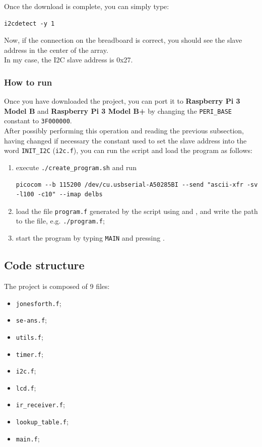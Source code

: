 \documentclass[a4paper, 12pt]{article}
\begin{document}
Once the download is complete, you can simply type:
\begin{Verbatim}[breaklines=true, breakanywhere=true]
    i2cdetect -y 1 
\end{Verbatim}
Now, if the connection on the breadboard is correct, you should see the slave address in the center of the array. \\
In my case, the I2C slave address is 0x27.

\subsubsection{How to run}

Once you have downloaded the project, you can port it to \textbf{Raspberry Pi 3 Model B} and \textbf{Raspberry Pi 3 Model B+} by changing the \texttt{PERI\_BASE} constant to \texttt{3F000000}. \\
After possibly performing this operation and reading the previous subsection, having changed if necessary the constant used to set the slave address into the word \texttt{INIT\_I2C} (\texttt{i2c.f}), you can run the script and load the program as follows:
\begin{enumerate}
    \item execute \texttt{./create\_program.sh} and run 
        \begin{Verbatim}[breaklines=true, breakanywhere=true]
        picocom --b 115200 /dev/cu.usbserial-A50285BI --send "ascii-xfr -sv -l100 -c10" --imap delbs
        \end{Verbatim}
    \item load the file \texttt{program.f} generated by the script using  and , and write the path to the file, e.g. \texttt{./program.f};
    \item start the program by typing \texttt{MAIN} and pressing \keys{\return}.
\end{enumerate}

\subsection{Code structure}

The project is composed of 9 files:
\begin{itemize}
    \item \texttt{jonesforth.f};
    \item \texttt{se-ans.f};
    \item \texttt{utils.f};
    \item \texttt{timer.f};
    \item \texttt{i2c.f};
    \item \texttt{lcd.f};
    \item \texttt{ir\_receiver.f};
    \item \texttt{lookup\_table.f};
    \item \texttt{main.f};
\end{itemize}
\end{document}
